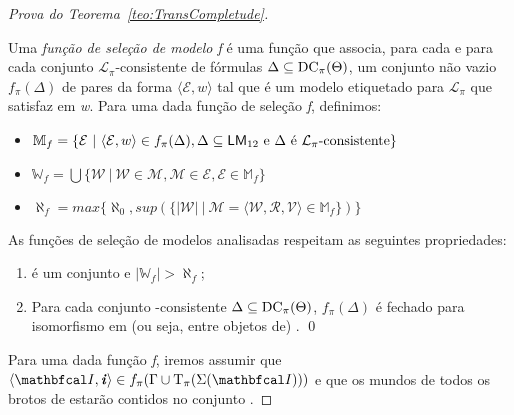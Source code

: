 \begin{apendicesenv}
\begin{proof}[Prova do Teorema~\ref{teo:TransCompletude}]
            \begin{definicao}
                \label{def:FuncaoSelecaoModelos}
                Uma \textit{função de seleção de modelo f} é uma função que associa, para cada \PI e para cada conjunto \(\mathcal{L}_{\pi}\)-consistente de fórmulas
                \(\Delta \subseteq \operatorname{DC}_{\pi}(\Theta)\), um conjunto não vazio \(f_{\pi}(\Delta)\) de pares da forma \(\langle \mathcal{E}, w \rangle\) tal que  é
                um modelo etiquetado para \(\mathcal{L}_{\pi}\) que satisfaz \DDELTA em \textit{w}. Para uma dada função de seleção \textit{f}, definimos:
                \begin{itemize}
                    \item \(\mathbb{M}_{f} = \{ \mathcal{E} \ | \ \langle \mathcal{E}, w \rangle \in f_{\pi}(\Delta), \Delta \subseteq \mathsf{LM}_{12} \text{ e \DDELTA é }
                            \mathcal{L}_{\pi} \text{-consistente} \}\)

                    \item \(\mathbb{W}_{f} = \bigcup \{\mathcal{W} \ | \ \mathcal{W} \in \mathcal{M}, \mathcal{M} \in \mathcal{E}, \mathcal{E} \in \mathbb{M}_{f} \}\)

                    \item \(\aleph_{f} = max\{ \aleph_{0}, sup\left(\{|\mathcal{W}| \ | \ \mathcal{M} = \langle \mathcal{W}, \mathcal{R}, \mathcal{V} \rangle \in \mathbb{M}_{f}\}\right) \}\)
                \end{itemize}
                As funções de seleção de modelos analisadas respeitam as seguintes propriedades:
                \begin{enumerate}%
                    \item {} é um conjunto e \(|\mathbb{W}_{f}| > \aleph_{f}\);

                    \item Para cada conjunto -consistente \(\Delta \subseteq \operatorname{DC}_{\pi}(\Theta)\), \(f_{\pi}(\Delta)\) é fechado para isomorfismo
                    em (ou seja, entre objetos de) . \qed
                \end{enumerate}
            \end{definicao}

            Para uma dada função \textit{f}, iremos assumir que \(\langle \modeloinicial, \mundoinicial \rangle \in f_{\pi}(\Gamma \cup \funcao{T}_{\pi}(\Sigma(\modeloinicial)))\)
            e que os mundos de todos os brotos de \Modeloinicial estarão contidos no conjunto .


\end{proof}
\end{apendicesenv}

